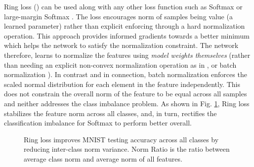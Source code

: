 \documentclass[10pt,twocolumn,letterpaper]{article}
\begin{document}
Ring loss () can be used along with any other loss function such as Softmax or large-margin Softmax \cite{liu2017sphereface}. The loss encourages norm of samples being value  (a learned parameter) rather than explicit enforcing through a hard normalization operation. This approach provides informed gradients towards a better minimum which helps the network to satisfy the normalization constraint. The network therefore, learns to normalize the features using \textit{model weights themselves} (rather than needing an explicit non-convex normalization operation as in \cite{ranjan2017l2}, or batch normalization \cite{ioffe2015batch}). In contrast and in connection, batch normalization \cite{ioffe2015batch} enforces the scaled normal distribution for each element in the feature independently. This does not constrain the overall norm of the feature to be equal across all samples and neither addresses the class imbalance problem. As shown in Fig. \ref{fig_accuracy}, Ring loss stabilizes the feature norm across all classes, and, in turn, rectifies the classification imbalance for Softmax to perform better overall. 

\begin{figure}\begin{center}
        \hspace{-0.85cm}
    \end{center}
    \vspace{-0.5cm}
\caption{Ring loss improves MNIST testing accuracy across all classes by reducing inter-class norm variance. Norm Ratio is the ratio between average class norm and average norm of all features.} 
\label{fig_accuracy}
\vspace{-0.7cm}
\end{figure}
\end{document}
